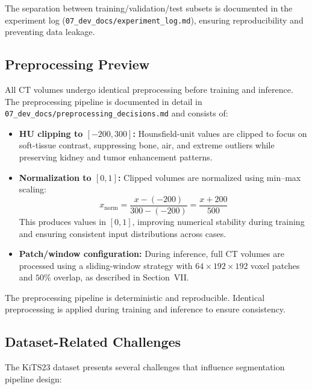 The separation between training/validation/test subsets is documented in the experiment log (\texttt{07\_dev\_docs/experiment\_log.md}), ensuring reproducibility and preventing data leakage.

\subsection{Preprocessing Preview}

All CT volumes undergo identical preprocessing before training and inference. The preprocessing pipeline is documented in detail in \texttt{07\_dev\_docs/preprocessing\_decisions.md} and consists of:

\begin{itemize}
    \item \textbf{HU clipping to $[-200, 300]$:} Hounsfield-unit values are clipped to focus on soft-tissue contrast, suppressing bone, air, and extreme outliers while preserving kidney and tumor enhancement patterns.
    \item \textbf{Normalization to $[0, 1]$:} Clipped volumes are normalized using min--max scaling:
    \begin{equation}
    x_{\text{norm}} = \frac{x - (-200)}{300 - (-200)} = \frac{x + 200}{500}
    \end{equation}
    This produces values in $[0, 1]$, improving numerical stability during training and ensuring consistent input distributions across cases.
    \item \textbf{Patch/window configuration:} During inference, full CT volumes are processed using a sliding-window strategy with $64 \times 192 \times 192$ voxel patches and $50\%$ overlap, as described in Section~VII.
\end{itemize}

The preprocessing pipeline is deterministic and reproducible. Identical preprocessing is applied during training and inference to ensure consistency.

\subsection{Dataset-Related Challenges}

The KiTS23 dataset presents several challenges that influence segmentation pipeline design:

